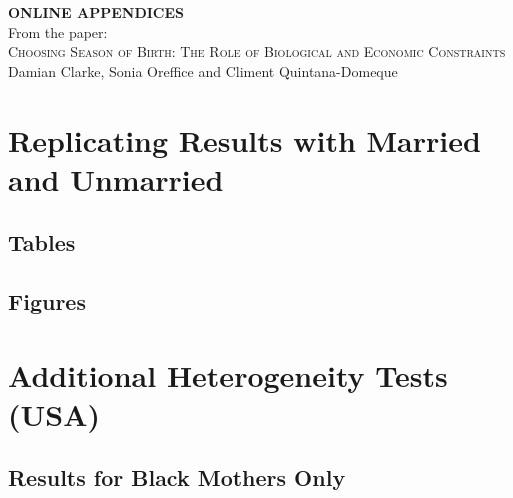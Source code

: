 \documentclass[a4paper, 12 pt]{article}
\theoremstyle{plain}
\begin{document}
\begin{spacing}{1.4}
\begin{center}
\textbf{ONLINE APPENDICES} \\
\vspace{4mm}
From the paper: \\
\vspace{6mm}
{\large \textsc{Choosing Season of Birth:
The Role of Biological and Economic Constraints}} \\
Damian Clarke, Sonia Oreffice and Climent Quintana-Domeque
\end{center}

\tableofcontents


\setlength\parindent{0.25in}
\setlength\parskip{0.25in}




\newpage
\section{Replicating Results with Married and Unmarried}
\subsection{Tables}

\newpage
\subsection{Figures}


\newpage
\section{Additional Heterogeneity Tests (USA)}
\subsection{Results for Black Mothers Only}
\begin{landscape}
  
\end{landscape}


\end{spacing}
\end{document}
